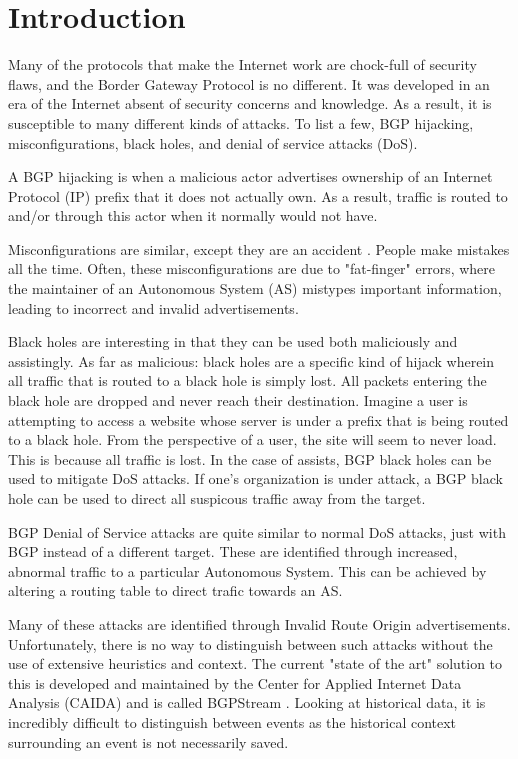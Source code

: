 \section{Introduction}
Many of the protocols that make the Internet work are chock-full of security
flaws, and the Border Gateway Protocol is no different. It was developed in an
era of the Internet absent of security concerns and knowledge. As a result, it
is susceptible to many different kinds of attacks. To list a few, BGP hijacking,
misconfigurations, black holes, and denial of service attacks (DoS).

A BGP hijacking is when a malicious actor advertises ownership of an Internet
Protocol (IP) prefix that it does not actually own\cite{bgp-hijacking}. As a
result, traffic is routed to and/or through this actor when it normally would
not have.

Misconfigurations are similar, except they are an accident
\cite{bgp-misconfigurations}. People make mistakes all the time. Often, these
misconfigurations are due to "fat-finger" errors, where the maintainer of an
Autonomous System (AS) mistypes important information, leading to incorrect and
invalid advertisements.

Black holes are interesting in that they can be used both maliciously and
assistingly. As far as malicious: black holes are a specific kind of hijack
wherein all traffic that is routed to a black hole is simply lost. All packets
entering the black hole are dropped and never reach their destination. Imagine a
user is attempting to access a website whose server is under a prefix that is
being routed to a black hole. From the perspective of a user, the site will seem
to never load. This is because all traffic is lost. In the case of assists, BGP
black holes can be used to mitigate DoS attacks. If one's organization is under
attack, a BGP black hole can be used to direct all suspicous traffic away from
the target\cite{black-holes-mitigation,black-holes}.

BGP Denial of Service attacks are quite similar to normal DoS attacks, just with
BGP instead of a different target. These are identified through increased,
abnormal traffic to a particular Autonomous System. This can be achieved by
altering a routing table to direct trafic towards an AS.

Many of these attacks are identified through Invalid Route Origin
advertisements. Unfortunately, there is no way to distinguish between such
attacks without the use of extensive heuristics and context. The current "state
of the art" solution to this is developed and maintained by the Center for
Applied Internet Data Analysis (CAIDA) and is called BGPStream \cite{bgpstream}.
Looking at historical data, it is incredibly difficult to distinguish between
events as the historical context surrounding an event is not necessarily saved.

